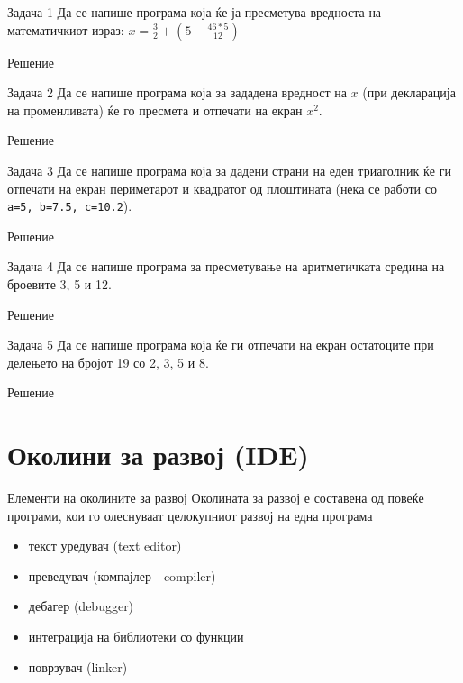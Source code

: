 \begin{frame}[fragile]{Задача 1}
	Да се напише програма која ќе ја пресметува вредноста на математичкиот израз:
	$ x = \frac{3}{2} + (5 - \frac{46 * 5}{12})$
	\begin{exampleblock}{Решение}
    
	\end{exampleblock}
\end{frame}

\begin{frame}[fragile]{Задача 2}
Да се напише програма која за зададена вредност на $ x $ (при декларација на променливата) ќе го пресмета и отпечати на екран $ x^2 $.
	\begin{exampleblock}{Решение}
	
	\end{exampleblock}
\end{frame}

\begin{frame}[fragile]{Задача 3}
Да се напише програма која за дадени страни на еден триаголник ќе ги отпечати на екран периметарот 
и квадратот од плоштината (нека се работи со \texttt{a=5, b=7.5, c=10.2}).
	\begin{exampleblock}{Решение}
	
	\end{exampleblock}
\end{frame}

\begin{frame}[fragile]{Задача 4}
Да се напише програма за пресметување на аритметичката средина на броевите 3, 5 и 12.
	\begin{exampleblock}{Решение}
	
	\end{exampleblock}
\end{frame}

\begin{frame}[fragile]{Задача 5}
Да се напише програма која ќе ги отпечати на екран остатоците при делењето на бројот 19 со 2, 3, 5 и 8.
	\begin{exampleblock}{Решение}
	
	\end{exampleblock}
\end{frame}

\section{Околини за развој (IDE)}

\begin{frame}{Елементи на околините за развој}
Околината за развој е составена од повеќе програми, кои го олеснуваат
целокупниот развој на една програма
\begin{itemize}
  \item текст уредувач (text editor)
  \item преведувач (компајлер - compiler)
  \item дебагер (debugger)
  \item интеграција на библиотеки со функции
  \item поврзувач (linker)
\end{itemize}
\end{frame}

